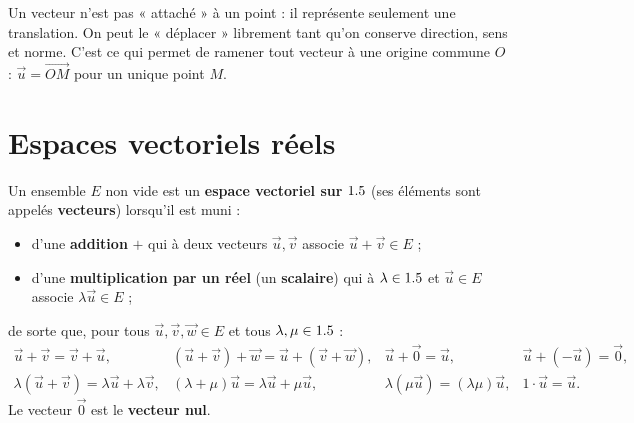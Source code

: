 \begin{illus}
\end{illus}

\begin{remarque}
Un vecteur n'est pas « attaché » à un point : il représente seulement une translation. On peut
le « déplacer » librement tant qu'on conserve direction, sens et norme. C'est ce qui permet de
ramener tout vecteur à une origine commune $O$ : $\vec u=\vec{OM}$ pour un unique point $M$.
\end{remarque}

\section{Espaces vectoriels réels}

\begin{definition}
Un ensemble $E$ non vide est un \textbf{espace vectoriel sur} $1.5$ (ses éléments sont appelés
\textbf{vecteurs}) lorsqu'il est muni :
\begin{itemize}
\item d'une \textbf{addition} $+$ qui à deux vecteurs $\vec u,\vec v$ associe $\vec u+\vec v\in E$ ;
\item d'une \textbf{multiplication par un réel} (un \textbf{scalaire}) qui à $\lambda\in1.5$ et $\vec u\in E$ associe $\lambda\vec u\in E$ ;
\end{itemize}
de sorte que, pour tous $\vec u,\vec v,\vec w\in E$ et tous $\lambda,\mu\in1.5$ :
\[
\begin{array}{llll}
\vec u+\vec v=\vec v+\vec u, & (\vec u+\vec v)+\vec w=\vec u+(\vec v+\vec w), & \vec u+\vec 0=\vec u, & \vec u+(-\vec u)=\vec 0,\\[3pt]
\lambda(\vec u+\vec v)=\lambda\vec u+\lambda\vec v, & (\lambda+\mu)\vec u=\lambda\vec u+\mu\vec u, & \lambda(\mu\vec u)=(\lambda\mu)\vec u, & 1\cdot\vec u=\vec u.
\end{array}
\]
Le vecteur $\vec 0$ est le \textbf{vecteur nul}.
\end{definition}

